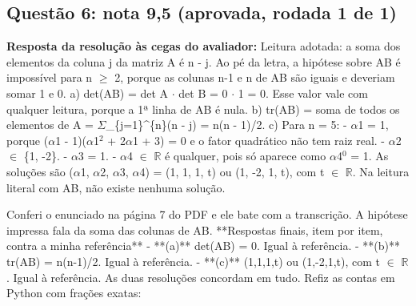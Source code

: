 \documentclass{article}%
\begin{document}
\subsection*{Questão 6: nota 9,5 (aprovada, rodada 1 de 1)}%
\textbf{Resposta da resolução às cegas do avaliador:} Leitura adotada: a soma dos elementos da coluna j da matriz A é n - j. Ao pé da letra, a hipótese sobre AB é impossível para n $\geq$ 2, porque as colunas n-1 e n de AB são iguais e deveriam somar 1 e 0.\newline%
\newline%
a) det(AB) = det A $\cdot$ det B = 0 $\cdot$ 1 = 0. Esse valor vale com qualquer leitura, porque a 1ª linha de AB é nula.\newline%
\newline%
b) tr(AB) = soma de todos os elementos de A = $\Sigma$\_\{j=1\}\^{}\{n\}(n - j) = n(n - 1)/2.\newline%
\newline%
c) Para n = 5:\newline%
{-} $\alpha$1 = 1, porque ($\alpha$1 - 1)($\alpha$1$^2$ + 2$\alpha$1 + 3) = 0 e o fator quadrático não tem raiz real.\newline%
{-} $\alpha$2 $\in$ \{1, -2\}.\newline%
{-} $\alpha$3 = 1.\newline%
{-} $\alpha$4 $\in$ $\mathbb{R}$ é qualquer, pois só aparece como $\alpha$4$^{0}$ = 1.\newline%
\newline%
As soluções são ($\alpha$1, $\alpha$2, $\alpha$3, $\alpha$4) = (1, 1, 1, t) ou (1, -2, 1, t), com t $\in$ $\mathbb{R}$. Na leitura literal com AB, não existe nenhuma solução.\par %
Conferi o enunciado na página 7 do PDF e ele bate com a transcrição. A hipótese impressa fala da soma das colunas de AB.\newline%
\newline%
**Respostas finais, item por item, contra a minha referência**\newline%
{-} **(a)** det(AB) = 0. Igual à referência.\newline%
{-} **(b)** tr(AB) = n(n-1)/2. Igual à referência.\newline%
{-} **(c)** (1,1,1,t) ou (1,-2,1,t), com t $\in$ $\mathbb{R}$. Igual à referência.\newline%
\newline%
As duas resoluções concordam em tudo. Refiz as contas em Python com frações exatas:\newline%
\end{document}
